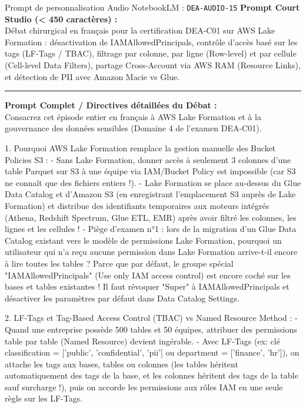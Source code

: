 \documentclass[11pt,a4paper]{article}
\begin{document}
\begin{promptbox}{Prompt de personnalisation Audio NotebookLM : \texttt{DEA-AUDIO-15}}
\textbf{Prompt Court Studio (< 450 caractères) :}\\
Débat chirurgical en français pour la certification DEA-C01 sur AWS Lake Formation : désactivation de IAMAllowedPrincipals, contrôle d'accès basé sur les tags (LF-Tags / TBAC), filtrage par colonne, par ligne (Row-level) et par cellule (Cell-level Data Filters), partage Cross-Account via AWS RAM (Resource Links), et détection de PII avec Amazon Macie vs Glue.

\medskip\hrule\medskip
\textbf{Prompt Complet / Directives détaillées du Débat :}\\
Consacrez cet épisode entier en français à AWS Lake Formation et à la gouvernance des données sensibles (Domaine 4 de l'examen DEA-C01).

1. Pourquoi AWS Lake Formation remplace la gestion manuelle des Bucket Policies S3 :
- Sans Lake Formation, donner accès à seulement 3 colonnes d'une table Parquet sur S3 à une équipe via IAM/Bucket Policy est impossible (car S3 ne connaît que des fichiers entiers !).
- Lake Formation se place au-dessus du Glue Data Catalog et d'Amazon S3 (en enregistrant l'emplacement S3 auprès de Lake Formation) et distribue des identifiants temporaires aux moteurs intégrés (Athena, Redshift Spectrum, Glue ETL, EMR) après avoir filtré les colonnes, les lignes et les cellules !
- Piège d'examen n°1 : lors de la migration d'un Glue Data Catalog existant vers le modèle de permissions Lake Formation, pourquoi un utilisateur qui n'a reçu aucune permission dans Lake Formation arrive-t-il encore à lire toutes les tables ? Parce que par défaut, le groupe spécial "IAMAllowedPrincipals" (Use only IAM access control) est encore coché sur les bases et tables existantes ! Il faut révoquer "Super" à IAMAllowedPrincipals et désactiver les paramètres par défaut dans Data Catalog Settings.

2. LF-Tags et Tag-Based Access Control (TBAC) vs Named Resource Method :
- Quand une entreprise possède 500 tables et 50 équipes, attribuer des permissions table par table (Named Resource) devient ingérable.
- Avec LF-Tags (ex: clé classification = ['public', 'confidential', 'pii'] ou department = ['finance', 'hr']), on attache les tags aux bases, tables ou colonnes (les tables héritent automatiquement des tags de la base, et les colonnes héritent des tags de la table sauf surcharge !), puis on accorde les permissions aux rôles IAM en une seule règle sur les LF-Tags.


\end{promptbox}
\end{document}
